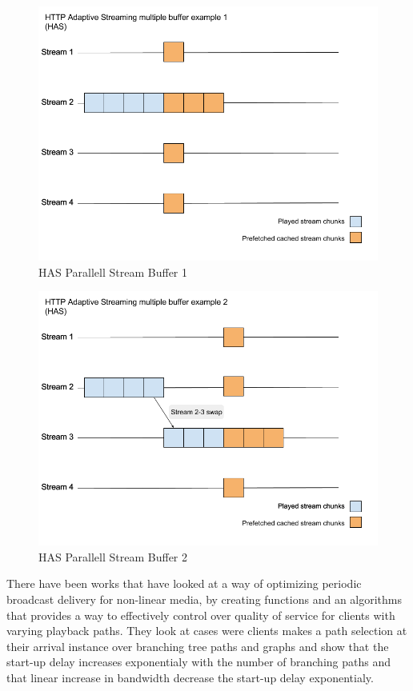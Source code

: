 \begin{figure}[!ht]
\begin{center}
\includegraphics[scale=0.4]{HAS1.png}
\caption{HAS Parallell Stream Buffer 1}
\label{fig:HAS1}
\end{center}
\end{figure}

\begin{figure}[!ht]
\begin{center}
\includegraphics[scale=0.4]{HAS2.png}
\caption{HAS Parallell Stream Buffer 2}
\label{fig:HAS2}
\end{center}
\end{figure}

There have been works that have looked at a way of optimizing periodic broadcast delivery for non-linear media, by creating functions and an algorithms that provides a way to effectively control over quality of service for clients with varying playback paths. They look at cases were clients makes a path selection at their arrival instance over branching tree paths and graphs and show that the start-up delay increases exponentialy with the number of branching paths and that linear increase in bandwidth decrease the start-up delay exponentialy.\cite{optimizedbroadcast}


